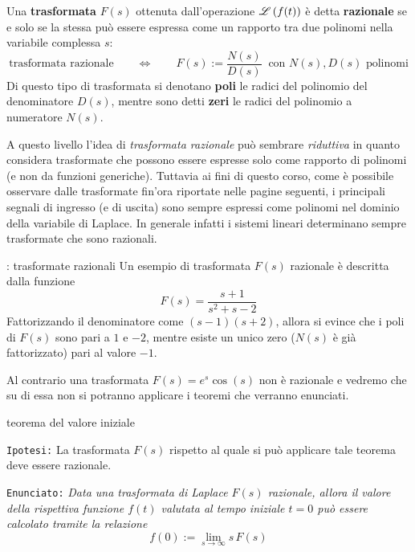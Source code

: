 		\begin{concetto}
			Una \textbf{trasformata} $F(s)$ ottenuta dall'operazione $\mathscr L \left( f(t) \right)$ è detta \textbf{razionale} se e solo se la stessa può essere espressa come un rapporto tra due polinomi nella variabile complessa $s$:
			\[ \textrm{trasformata razionale} \qquad \Leftrightarrow \qquad F(s) := \frac{N(s)}{D(s)} \ \textrm{ con $N(s), D(s)$ polinomi}  \]			
			Di questo tipo di trasformata si denotano \textbf{poli} le radici del polinomio del denominatore $D(s)$, mentre sono detti \textbf{zeri} le radici del polinomio a numeratore $N(s)$.
		\end{concetto}
		\begin{nota}
			A questo livello l'idea di \textit{trasformata razionale} può sembrare \textit{riduttiva} in quanto considera trasformate che possono essere espresse solo come rapporto di polinomi (e non da funzioni generiche). Tuttavia ai fini di questo corso, come è possibile osservare dalle trasformate fin'ora riportate nelle pagine seguenti, i principali segnali di ingresso (e di uscita) sono sempre espressi come polinomi nel dominio della variabile di Laplace. In generale infatti i sistemi lineari determinano sempre trasformate che sono razionali.
		\end{nota}
		\begin{esempio}{: trasformate razionali}
			Un esempio di trasformata $F(s)$ razionale è descritta dalla funzione
			\[ F(s) = \frac{s+1}{s^2 +s-2}\]
			Fattorizzando il denominatore come $(s-1)(s+2)$, allora si evince che i poli di $F(s)$ sono pari a $1$ e $-2$, mentre esiste un unico zero ($N(s)$ è già fattorizzato) pari al valore $-1$.
			
			Al contrario una trasformata $F(s) = e^s \cos(s)$ non è razionale e vedremo che su di essa non si potranno applicare i teoremi che verranno enunciati.
		\end{esempio}
		
		\begin{teorema}{teorema del valore iniziale} 
			
			\texttt{Ipotesi:} \label{teor:valiniziale} La trasformata $F(s)$ rispetto al quale si può applicare tale teorema deve essere razionale. \vspace{3mm}
			
			\texttt{Enunciato:} \textit{Data una trasformata di Laplace $F(s)$ razionale, allora il valore della rispettiva funzione $f(t)$ valutata al tempo iniziale $t = 0$ può essere calcolato tramite la relazione}
			\begin{equation}
				f(0) := \lim_{s\rightarrow \infty} s\,F(s)
			\end{equation}
		\end{teorema}
	
